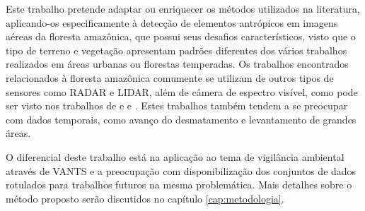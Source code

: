 Este trabalho pretende adaptar ou enriquecer os métodos utilizados na literatura, aplicando-os especificamente à detecção de elementos antrópicos em imagens aéreas da floresta amazônica, que possui seus desafios característicos, visto que o tipo de terreno e vegetação apresentam padrões diferentes dos vários trabalhos realizados em áreas urbanas ou florestas temperadas. Os trabalhos encontrados relacionados à floresta amazônica comumente se utilizam de outros tipos de sensores como RADAR e LIDAR, além de câmera de espectro visível, como pode ser visto nos trabalhos de  e  e . Estes trabalhos também tendem a se preocupar com dados temporais, como avanço do desmatamento e levantamento de grandes áreas.

O diferencial deste trabalho está na aplicação ao tema de vigilância ambiental através de VANTS e a preocupação com disponibilização dos conjuntos de dados rotulados para trabalhos futuros na mesma problemática. Mais detalhes sobre o método proposto serão discutidos no capítulo \ref{cap:metodologia}.
